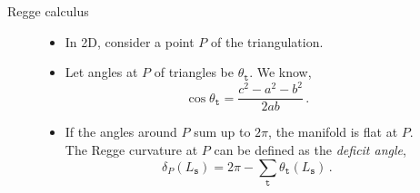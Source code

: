 \documentclass[12pt,titlepage]{article}
\begin{document}
\begin{frame}{Regge calculus}
\begin{list}{\,}{\leftmargin=1em \itemindent=0em}
\begin{figure}[!ht]
\begin{minipage}{0.3\linewidth}
            \end{minipage}
            \begin{minipage}{0.7\linewidth}
                \begin{itemize}{\leftmargin=0em \itemindent=0em}
                    \item In 2D, consider a point $P$ of the triangulation.
                    \item Let angles at $P$ of triangles be $\theta_\mathtt{t}$. We know,
                    \begin{equation}
                        \cos{\theta_\mathtt{t}}=\frac{c^2-a^2-b^2}{2ab}\,.
                    \end{equation}
                    \item If the angles around $P$ sum up to $2\pi$, the manifold is flat at $P$. The Regge curvature at $P$ can be defined as the \textit{deficit angle},
                    \begin{equation}
                        \delta_P(L_\mathtt{s})=2\pi-\sum_\mathtt{t} \theta_\mathtt{t}(L_\mathtt{s})\,.
                    \end{equation}
                \end{itemize}
            \end{minipage}
        \end{figure}\FloatBarrier
    \end{list}
\end{frame}
\end{document}
